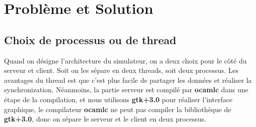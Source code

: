 \documentclass[14px]{article}
\begin{document}
\begin{enumerate}
\begin{figure}[htbp]
{\begin{minipage}[t]{0.3\linewidth}
            \end{minipage}%
        }%
        \centering
    \end{figure}

\end{enumerate}
\clearpage

\section{Problème et Solution}
\subsection{Choix de processus ou de thread}
Quand on désigne l'architecture du simulateur, on a deux choix pour le côté du serveur et client. Soit on les sépare en deux threads, soit deux processus. Les avantages du thread est que c'est plus facile de partager les données et réaliser la synchronization. Néanmoins, la partie serveur est compilé par \textbf{ocamlc} dans une étape de la compilation, et nous utilisons \textbf{gtk+3.0} pour réaliser l'interface graphique, le compilateur \textbf{ocamlc} ne peut pas compiler la bibliothèque de \textbf{gtk+3.0}, donc on sépare le serveur et le client en deux processus.
\end{document}
